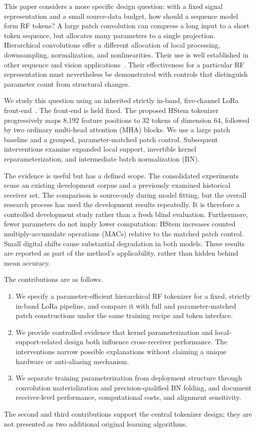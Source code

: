 \documentclass[journal]{IEEEtran}
\newcommand{\method}{HStem}
\begin{document}
This paper considers a more specific design question: with a fixed signal representation and a small source-data budget, how should a sequence model form RF tokens? A large patch convolution can compress a long input to a short token sequence, but allocates many parameters to a single projection. Hierarchical convolutions offer a different allocation of local processing, downsampling, normalization, and nonlinearities. Their use is well established in other sequence and vision applications~\cite{cvt2021}. Their effectiveness for a particular RF representation must nevertheless be demonstrated with controls that distinguish parameter count from structural changes.

We study this question using an inherited strictly in-band, five-channel LoRa front-end~\cite{prioroob}. The front-end is held fixed. The proposed \method{} tokenizer progressively maps 8,192 feature positions to 32 tokens of dimension 64, followed by two ordinary multi-head attention (MHA) blocks. We use a large patch baseline and a grouped, parameter-matched patch control. Subsequent interventions examine expanded local support, invertible kernel reparameterization, and intermediate batch normalization (BN).

The evidence is useful but has a defined scope. The consolidated experiments reuse an existing development corpus and a previously examined historical receiver set. The comparison is source-only during model fitting, but the overall research process has used the development results repeatedly. It is therefore a controlled development study rather than a fresh blind evaluation. Furthermore, fewer parameters do not imply lower computation: \method{} increases counted multiply-accumulate operations (MACs) relative to the matched patch control. Small digital shifts cause substantial degradation in both models. These results are reported as part of the method's applicability, rather than hidden behind mean accuracy.

The contributions are as follows.
\begin{enumerate}
\item We specify a parameter-efficient hierarchical RF tokenizer for a fixed, strictly in-band LoRa pipeline, and compare it with full and parameter-matched patch constructions under the same training recipe and token interface.
\item We provide controlled evidence that kernel parameterization and local-support-related design both influence cross-receiver performance. The interventions narrow possible explanations without claiming a unique hardware or anti-aliasing mechanism.
\item We separate training parameterization from deployment structure through convolution materialization and precision-qualified BN folding, and document receiver-level performance, computational costs, and alignment sensitivity.
\end{enumerate}
The second and third contributions support the central tokenizer design; they are not presented as two additional original learning algorithms.
\end{document}
